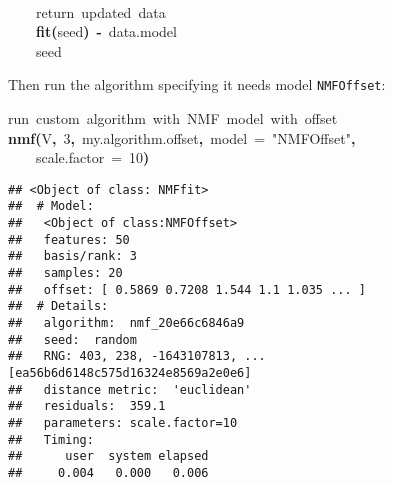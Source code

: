\documentclass[a4paper]{article}\usepackage{graphicx, color}
\makeatletter
\newcommand{\hlnumber}[1]{\textcolor[rgb]{0,0,0}{#1}}%
\newcommand{\hlfunctioncall}[1]{\textcolor[rgb]{0.501960784313725,0,0.329411764705882}{\textbf{#1}}}%
\newcommand{\hlstring}[1]{\textcolor[rgb]{0.6,0.6,1}{#1}}%
\newcommand{\hlkeyword}[1]{\textcolor[rgb]{0,0,0}{\textbf{#1}}}%
\newcommand{\hlargument}[1]{\textcolor[rgb]{0.690196078431373,0.250980392156863,0.0196078431372549}{#1}}%
\newcommand{\hlcomment}[1]{\textcolor[rgb]{0.180392156862745,0.6,0.341176470588235}{#1}}%
\newcommand{\hlassignement}[1]{\textcolor[rgb]{0,0,0}{\textbf{#1}}}%
\newcommand{\hlsymbol}[1]{\textcolor[rgb]{0,0,0}{#1}}%
\newcommand{\hlstd}[1]{\textcolor[rgb]{0,0,0}{#1}}%
\newenvironment{kframe}{%
 \def\FrameCommand##1{\hskip\@totalleftmargin \hskip-\fboxsep
 \colorbox{shadecolor}{##1}\hskip-\fboxsep
     \hskip-\linewidth \hskip-\@totalleftmargin \hskip\columnwidth}%
 \MakeFramed {\advance\hsize-\width
   \@totalleftmargin\z@ \linewidth\hsize
   \@setminipage}}%
 {\par\unskip\endMakeFramed}
\newenvironment{knitrout}{}{} %
\let\code=\texttt
\makeatother
\begin{document}
\begin{knitrout}
\begin{kframe}
\begin{flushleft}
\hlstd{}\hspace*{\fill}\\
\hlstd{}{\ }{\ }{\ }{\ }\hlcomment{\usebox{\hlnormalsizeboxhash}{\ }return{\ }updated{\ }data}\hspace*{\fill}\\
\hlstd{}{\ }{\ }{\ }{\ }\hlfunctioncall{fit}\hlkeyword{(}\hlsymbol{seed}\hlkeyword{)}{\ }\hlassignement{\usebox{\hlnormalsizeboxlessthan}-}{\ }\hlsymbol{data.model}\hspace*{\fill}\\
\hlstd{}{\ }{\ }{\ }{\ }\hlsymbol{seed}\hspace*{\fill}\\
\hlstd{}\hlkeyword{\usebox{\hlnormalsizeboxclosebrace}}\mbox{}
\normalfont
\end{flushleft}
\end{kframe}
\end{knitrout}


Then run the algorithm specifying it needs model \code{NMFOffset}:
\begin{knitrout}
\color{fgcolor}\begin{kframe}
\begin{flushleft}
\ttfamily\noindent
\hlcomment{\usebox{\hlnormalsizeboxhash}{\ }run{\ }custom{\ }algorithm{\ }with{\ }NMF{\ }model{\ }with{\ }offset}\hspace*{\fill}\\
\hlstd{}\hlfunctioncall{nmf}\hlkeyword{(}\hlsymbol{V}\hlkeyword{,}{\ }\hlnumber{3}\hlkeyword{,}{\ }\hlsymbol{my.algorithm.offset}\hlkeyword{,}{\ }\hlargument{model}{\ }\hlargument{=}{\ }\hlstring{"{}NMFOffset"{}}\hlkeyword{,}\hspace*{\fill}\\
\hlstd{}{\ }{\ }{\ }{\ }\hlargument{scale.factor}{\ }\hlargument{=}{\ }\hlnumber{10}\hlkeyword{)}\mbox{}
\normalfont
\end{flushleft}
\begin{verbatim}
## <Object of class: NMFfit>
##  # Model:
##   <Object of class:NMFOffset>
##   features: 50 
##   basis/rank: 3 
##   samples: 20 
##   offset: [ 0.5869 0.7208 1.544 1.1 1.035 ... ]
##  # Details:
##   algorithm:  nmf_20e66c6846a9 
##   seed:  random 
##   RNG: 403, 238, -1643107813, ... [ea56b6d6148c575d16324e8569a2e0e6]
##   distance metric:  'euclidean' 
##   residuals:  359.1 
##   parameters: scale.factor=10 
##   Timing:
##      user  system elapsed 
##     0.004   0.000   0.006 
\end{verbatim}
\end{kframe}
\end{knitrout}
\end{document}
